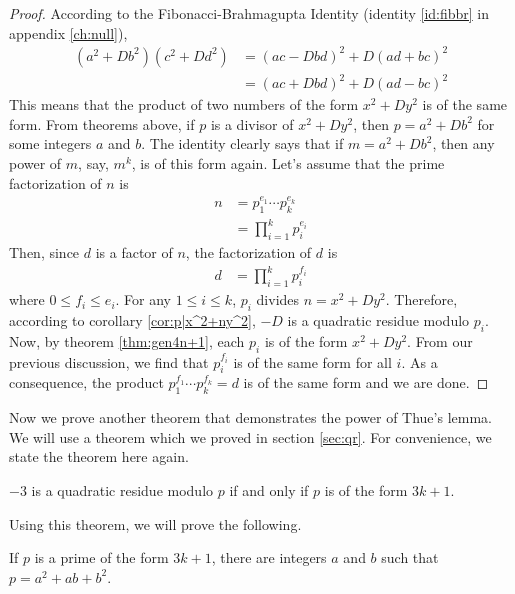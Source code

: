\documentclass{subfile}
\begin{document}
	\begin{proof}
		According to the Fibonacci-Brahmagupta Identity (identity \autoref{id:fibbr} in appendix \autoref{ch:null}),
			\begin{align*}
				(a^2+Db^2)(c^2+Dd^2)& =(ac-Dbd)^2+D(ad+bc)^2\\
				& =(ac+Dbd)^2+D(ad-bc)^2
			\end{align*}
		This means that the product of two numbers of the form $x^2+Dy^2$ is of the same form. From theorems above, if $p$ is a divisor of $x^2+Dy^2$, then $p=a^2+Db^2$ for some integers $a$ and $b$. The identity clearly says that if $m=a^2+Db^2$, then any power of $m$, say, $m^k$, is of this form again. Let's assume that the prime factorization of $n$ is
			\begin{align*}
				n
					& = p_1^{e_1}\cdots p_k^{e_k}\\
					& = \prod_{i=1}^{k}p_i^{e_i}
			\end{align*}
		Then, since $d$ is a factor of $n$, the factorization of $d$ is
			\begin{align*}
				d & = \prod_{i=1}^{k}p_i^{f_i}
			\end{align*}
		where $0\leq f_i\leq e_i$. For any $1\leq i\leq k$, $p_i$ divides $n=x^2+Dy^2$. Therefore, according to corollary \autoref{cor:p|x^2+ny^2}, $-D$ is a quadratic residue modulo $p_i$. Now, by theorem \autoref{thm:gen4n+1}, each $p_i$ is of the form $x^2+Dy^2$. From our previous discussion, we find that $p_i^{f_i}$ is of the same form for all $i$. As a consequence, the product $p_1^{f_1}\cdots p_k^{f_k}=d$ is of the same form and we are done.
	\end{proof}
	Now we prove another theorem that demonstrates the power of Thue's lemma. We will use a theorem which we proved in section \autoref{sec:qr}. For convenience, we state the theorem here again.
		\begin{theorem}
			$-3$ is a quadratic residue modulo $p$ if and only if $p$ is of the form $3k+1$.
		\end{theorem}
	Using this theorem, we will prove the following.
		\begin{theorem}
			If $p$ is a prime of the form $3k+1$, there are integers $a$ and $b$ such that $p=a^2+ab+b^2$.
		\end{theorem}
\end{document}

